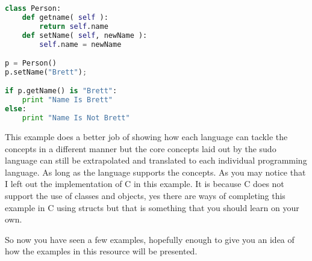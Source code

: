 \begin{lstlisting}[language=python,caption={Example 2 - Python}]
class Person:
    def getname( self ):
        return self.name
    def setName( self, newName ):
        self.name = newName

p = Person()
p.setName("Brett");

if p.getName() is "Brett":
    print "Name Is Brett"
else:
    print "Name Is Not Brett"
\end{lstlisting}

This example does a better job of showing how each language can tackle the concepts in a different manner but the core concepts
laid out by the sudo language can still be extrapolated and translated to each individual programming language.
As long as the language supports the concepts.
As you may notice that I left out the implementation of C in this example.
It is because C does not support the use of classes and objects, yes there are ways of completing this example in C using structs but that
is something that you should learn on your own.
\par

So now you have seen a few examples, hopefully enough to give you an idea of how the examples in this resource will be presented.
